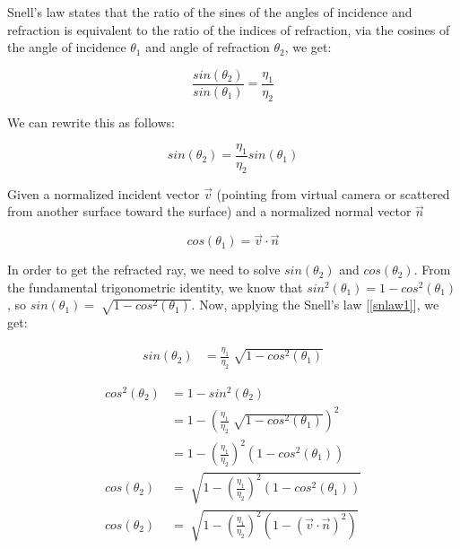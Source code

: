 \documentclass[titlepage,12pt]{report}
\begin{document}
Snell's law states that the ratio of the sines of the angles of incidence and refraction is equivalent to the ratio of the indices of refraction, via the cosines of the angle of incidence $\theta_1$ and angle of refraction $\theta_2$, we get:

\begin{equation}
	\frac{sin(\theta_2)}{sin(\theta_1)} = \frac{\eta_1}{\eta_2}
\end{equation}

We can rewrite this as follows:

\begin{equation}
	sin(\theta_2) = \frac{\eta_1}{\eta_2} sin(\theta_1)\label{snlaw1}
\end{equation}

Given a normalized incident vector $\vec{v}$ (pointing from virtual camera or scattered from another surface toward the surface) and a normalized normal vector $\vec{n}$

\begin{equation}
	cos(\theta_1) = \vec{v} \cdot \vec{n}
\end{equation}

In order to get the refracted ray, we need to solve $sin(\theta_2)$ and $cos(\theta_2)$. From the fundamental trigonometric identity, we know that $sin^2(\theta_1) = 1 - cos^2(\theta_1)$, so $sin(\theta_1) = \sqrt[]{1 - cos^2(\theta_1)}$. Now, applying the Snell's law [\ref{snlaw1}], we get:

\begin{equation}
\begin{split}
	sin(\theta_2) & = \frac{\eta_1}{\eta_2} \sqrt[]{1-cos^2(\theta_1)}
\end{split}
\end{equation}

\begin{equation} \label{eq1}
\begin{split}
cos^2(\theta_2) & = 1 - sin^2(\theta_2) \\
 & = 1 - \left(\frac{\eta_1}{\eta_2} \sqrt[]{1-cos^2(\theta_1)} \right)^2 \\
 & = 1 - \left(\frac{\eta_1}{\eta_2} \right)^2 \left(1-cos^2(\theta_1)\right) \\
cos(\theta_2) & = \sqrt[]{1 - \left(\frac{\eta_1}{\eta_2} \right)^2 \left(1-cos^2(\theta_1)\right)} \\
cos(\theta_2) & = \sqrt[]{1 - \left(\frac{\eta_1}{\eta_2} \right)^2 \left(1 - ( \vec{v} \cdot \vec{n})^2\right)}
\end{split}
\end{equation}
\end{document}
